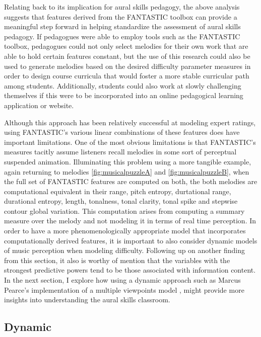 \documentclass[12pt,]{book}
\begin{document}
Relating back to its implication for aural skills pedagogy, the above analysis suggests that features derived from the FANTASTIC toolbox can provide a meaningful step forward in helping standardize the assessment of aural skills pedagogy.
If pedagogues were able to employ tools such as the FANTASTIC toolbox, pedagogues could not only select melodies for their own work that are able to hold certain features constant, but the use of this research could also be used to generate melodies based on the desired difficulty parameter measures in order to design course curricula that would foster a more stable curricular path among students.
Additionally, students could also work at slowly challenging themselves if this were to be incorporated into an online pedagogical learning application or website.

Although this approach has been relatively successful at modeling expert ratings, using FANTASTIC's various linear combinations of these features does have important limitations.
One of the most obvious limitations is that FANTASTIC's measures tacitly assume listeners recall melodies in some sort of perceptual suspended animation.
Illuminating this problem using a more tangible example, again returning to melodies \ref{fig:musicalpuzzleA} and \ref{fig:musicalpuzzleB}, when the full set of FANTASTIC features are computed on both, the both melodies are computational equivalent in their range, pitch entropy, durtational range, durational entropy, length, tonalness, tonal clarity, tonal spike and stepwise contour global variation.
This computation arises from computing a summary measure over the melody and not modeling it in terms of real time perception.
In order to have a more phenomenologically appropriate model that incorporates computationally derived features, it is important to also consider dynamic models of music perception when modeling difficulty.
Following up on another finding from this section, it also is worthy of mention that the variables with the strongest predictive powers tend to be those associated with information content.
In the next section, I explore how using a dynamic approach such as Marcus Pearce's implementation \citep{pearceConstructionEvaluationStatistical2005, pearceStatisticalLearningProbabilistic2018a} of a multiple viewpoints model \citep{conklinMultipleViewpointSystems1995}, might provide more insights into understanding the aural skills classroom.

\hypertarget{dynamic}{%
\subsection{Dynamic}\label{dynamic}}
\end{document}
